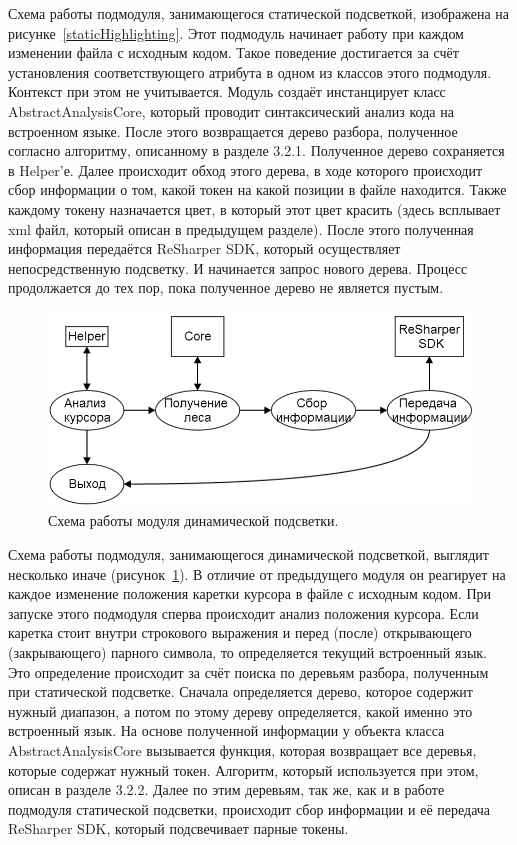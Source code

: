Схема работы подмодуля, занимающегося статической подсветкой, изображена на рисунке~\ref{staticHighlighting}. Этот подмодуль начинает работу при каждом изменении файла с исходным кодом. Такое поведение достигается за счёт установления соответствующего атрибута в одном из классов этого подмодуля. Контекст при этом не учитывается. Модуль создаёт инстанцирует класс AbstractAnalysisCore, который проводит синтаксический анализ кода на встроенном языке. После этого возвращается дерево разбора, полученное согласно алгоритму, описанному в разделе 3.2.1. Полученное дерево сохраняется в Helper’е. Далее происходит обход этого дерева, в ходе которого происходит сбор информации о том, какой токен на какой позиции в файле находится. Также каждому токену назначается цвет, в который этот цвет красить (здесь всплывает xml файл, который описан в предыдущем разделе). После этого полученная информация передаётся ReSharper SDK, который осуществляет непосредственную подсветку. И начинается запрос нового дерева. Процесс продолжается до тех пор, пока полученное дерево не является пустым.

\begin{figure}[t]
\centering
\includegraphics[width=\linewidth]{Ivanov/Pictures/dynamicHighlighting.png}
\caption{Схема работы модуля динамической подсветки.}
\label{dynamicHighlighting}
\end{figure}

Схема работы подмодуля, занимающегося динамической подсветкой, выглядит несколько иначе (рисунок~\ref{dynamicHighlighting}). В отличие от предыдущего модуля он реагирует на каждое изменение положения каретки курсора в файле с исходным кодом. При запуске этого подмодуля сперва происходит анализ положения курсора. Если каретка стоит внутри строкового выражения и перед (после) открывающего (закрывающего) парного символа, то определяется текущий встроенный язык. Это определение происходит за счёт поиска по деревьям разбора, полученным при статической подсветке. Сначала определяется дерево, которое содержит нужный диапазон, а потом по этому дереву определяется, какой именно это встроенный язык. На основе полученной информации у объекта класса AbstractAnalysisCore вызывается функция, которая возвращает все деревья, которые содержат нужный токен. Алгоритм, который используется при этом, описан в разделе 3.2.2. Далее по этим деревьям, так же, как и в работе подмодуля статической подсветки, происходит сбор информации и её передача ReSharper SDK, который подсвечивает парные токены. 


